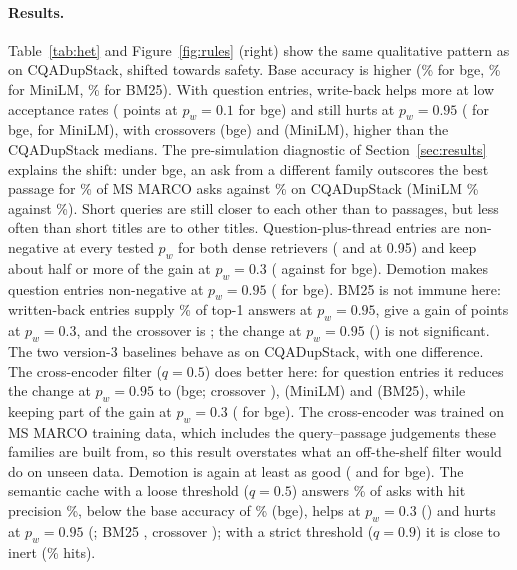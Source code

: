 \documentclass[11pt]{article}
\begin{document}
\paragraph{Results.} Table~\ref{tab:het} and Figure~\ref{fig:rules} (right) show the same qualitative pattern as on CQADupStack, shifted towards safety. Base accuracy is higher (\hAccBge\% for bge, \hAccMini\% for MiniLM, \hAccBm\% for BM25). With question entries, write-back helps more at low acceptance rates (\hOBgeAsk{} points at $p_w=0.1$ for bge) and still hurts at $p_w=0.95$ (\hFBgeAsk{} for bge, \hFMiniAsk{} for MiniLM), with crossovers \hPiBgeAsk{} (bge) and \hPiMiniAsk{} (MiniLM), higher than the CQADupStack medians. The pre-simulation diagnostic of Section~\ref{sec:results} explains the shift: under bge, an ask from a different family outscores the best passage for \hOtherBge\% of MS MARCO asks against \cqOtherBge\% on CQADupStack (MiniLM \hOtherMini\% against \cqOtherMini\%). Short queries are still closer to each other than to passages, but less often than short titles are to other titles. Question-plus-thread entries are non-negative at every tested $p_w$ for both dense retrievers (\hFBgeAd{} and \hFMiniAd{} at 0.95) and keep about half or more of the gain at $p_w=0.3$ (\hTBgeAd{} against \hTBgeAsk{} for bge). Demotion makes question entries non-negative at $p_w=0.95$ (\hFBgeAskDem{} for bge). BM25 is not immune here: written-back entries supply \hSelfBmAsk\% of top-1 answers at $p_w=0.95$, give a gain of \hTBmAsk{} points at $p_w=0.3$, and the crossover is \hPiBmAsk; the change at $p_w=0.95$ (\hFBmAsk) is not significant. The two version-3 baselines behave as on CQADupStack, with one difference. The cross-encoder filter ($q=0.5$) does better here: for question entries it reduces the change at $p_w=0.95$ to \hFBgeAskFltH{} (bge; crossover \hPBgeAskFltH), \hFMiniAskFltH{} (MiniLM) and \hFBmAskFltH{} (BM25), while keeping part of the gain at $p_w=0.3$ (\hTBgeAskFltH{} for bge). The cross-encoder was trained on MS MARCO training data, which includes the query--passage judgements these families are built from, so this result overstates what an off-the-shelf filter would do on unseen data. Demotion is again at least as good (\hFBgeAskDem{} and \hTBgeAskDem{} for bge). The semantic cache with a loose threshold ($q=0.5$) answers \hHitBgeAskCacheH\% of asks with hit precision \hPrecBgeAskCacheH\%, below the base accuracy of \hAccBge\% (bge), helps at $p_w=0.3$ (\hTBgeAskCacheH) and hurts at $p_w=0.95$ (\hFBgeAskCacheH; BM25 \hFBmAskCacheH, crossover \hPBmAskCacheH); with a strict threshold ($q=0.9$) it is close to inert (\hHitBgeAskCacheN\% hits).
\end{document}
